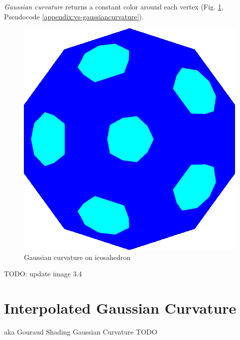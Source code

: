 \textit{Gaussian curvature} returns a constant color around each vertex (Fig. \ref{fig:gc-icosahedron}, Pseudocode \ref{appendix:vs-gaussiancurvature}).
\begin{figure}[h]
    \centering
    \includegraphics[scale=0.2]{images/gaussian-ball.png}
    \caption{Gaussian curvature on icosahedron}\label{fig:gc-icosahedron}
\end{figure}
TODO: update image 3.4

\section{Interpolated Gaussian Curvature}
aka Gouraud Shading Gaussian Curvature
TODO

